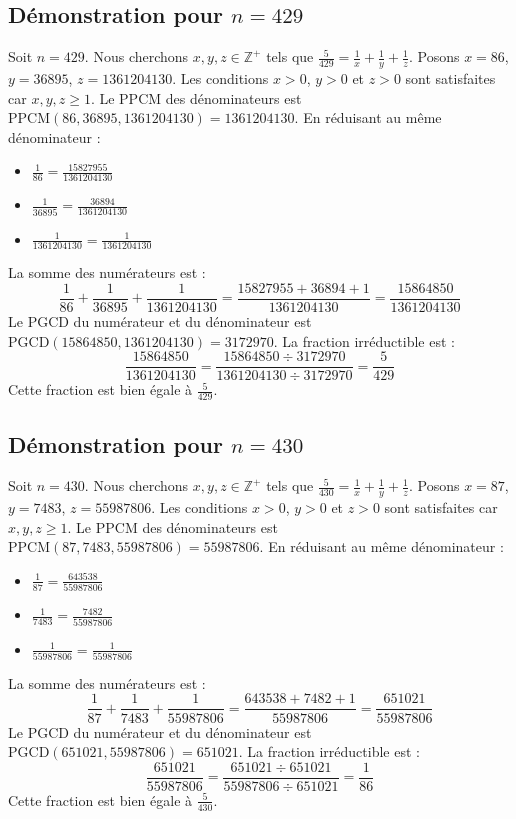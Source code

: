 \documentclass[11pt,a4paper]{article}
\begin{document}
\subsection{Démonstration pour $n = 429$}
Soit $n = 429$. Nous cherchons $x, y, z \in \mathbb{Z}^{+}$ tels que $\frac{5}{429} = \frac{1}{x} + \frac{1}{y} + \frac{1}{z}$.
Posons $x = 86$, $y = 36895$, $z = 1361204130$.
Les conditions $x > 0$, $y > 0$ et $z > 0$ sont satisfaites car $x, y, z \geq 1$.
Le PPCM des dénominateurs est $\text{PPCM}(86, 36895, 1361204130) = 1361204130$.
En réduisant au même dénominateur :
\begin{itemize}
    \item $\frac{1}{86} = \frac{15827955}{1361204130}$
    \item $\frac{1}{36895} = \frac{36894}{1361204130}$
    \item $\frac{1}{1361204130} = \frac{1}{1361204130}$
\end{itemize}
La somme des numérateurs est :
$$ \frac{1}{86} + \frac{1}{36895} + \frac{1}{1361204130} = \frac{15827955 + 36894 + 1}{1361204130} = \frac{15864850}{1361204130} $$
Le PGCD du numérateur et du dénominateur est $\text{PGCD}(15864850, 1361204130) = 3172970$.
La fraction irréductible est :
$$ \frac{15864850}{1361204130} = \frac{15864850 \div 3172970}{1361204130 \div 3172970} = \frac{5}{429} $$
Cette fraction est bien égale à $\frac{5}{429}$.

\subsection{Démonstration pour $n = 430$}
Soit $n = 430$. Nous cherchons $x, y, z \in \mathbb{Z}^{+}$ tels que $\frac{5}{430} = \frac{1}{x} + \frac{1}{y} + \frac{1}{z}$.
Posons $x = 87$, $y = 7483$, $z = 55987806$.
Les conditions $x > 0$, $y > 0$ et $z > 0$ sont satisfaites car $x, y, z \geq 1$.
Le PPCM des dénominateurs est $\text{PPCM}(87, 7483, 55987806) = 55987806$.
En réduisant au même dénominateur :
\begin{itemize}
    \item $\frac{1}{87} = \frac{643538}{55987806}$
    \item $\frac{1}{7483} = \frac{7482}{55987806}$
    \item $\frac{1}{55987806} = \frac{1}{55987806}$
\end{itemize}
La somme des numérateurs est :
$$ \frac{1}{87} + \frac{1}{7483} + \frac{1}{55987806} = \frac{643538 + 7482 + 1}{55987806} = \frac{651021}{55987806} $$
Le PGCD du numérateur et du dénominateur est $\text{PGCD}(651021, 55987806) = 651021$.
La fraction irréductible est :
$$ \frac{651021}{55987806} = \frac{651021 \div 651021}{55987806 \div 651021} = \frac{1}{86} $$
Cette fraction est bien égale à $\frac{5}{430}$.
\end{document}
